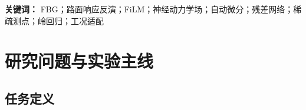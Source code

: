 \documentclass[11pt,a4paper]{article}
\newcommand{\ue}{\,\mu\varepsilon}
\begin{document}
\begin{abstract}
本报告系统整理了 FBG 路面响应反演模型从原始 Step19 FiLM 条件调制神经动力学场，到残差网络、空间边界专家、稀疏岭仿射校准以及稳健门控方案的完整实验演进。原始模型把空间位置与加载工况分别编码，以加载编码产生逐层 FiLM 缩放和平移参数，网络先学习连续位移代理场，再通过自动微分获得与 FBG 对齐的纵、横向应变。该模型在训练集和验证集上分别达到 $R^2=0.9535$ 和 $0.9659$，但独立测试集仅为 $0.7810$；其中 40\,kg 纵中心线 95\,cm 极边界工况为最明显短板，$R^2=0.3703$、RMSE $=202.898\ue$。

为解决该问题，首先进行了 Residual-FiLM 与空间边界专家（MoE 风格）的快速筛选。小规模快速实验曾显示轻微收益，但在恢复 Step19 的网络宽度、FiLM 层数、边界特征、镜像增强、5 折工况级划分和 2400 次迭代后，原始 SOTA 在完整零样本测试上达到 $R^2=0.8467$、RMSE $=79.51\ue$，显著优于 Residual-FiLM 的 $R^2=0.7106$、RMSE $=109.26\ue$。因此，残差与专家结构均未被选作最终主干。

随后将问题从“重建整套网络”转化为“利用少量新工况测点校正系统性幅值与零偏”。在冻结 SOTA 主干后，采用带收缩先验的仿射校准
$\hat y_{\mathrm{cal}}=a\hat y+b$。20 次独立嵌套空间划分的最终实验表明：Ridge-6 的总体 $R^2$ 由 $0.8412$ 提升到 $0.8623$，RMSE 由 $86.63\ue$ 降至 $80.44\ue$，平均下降 $7.15\%$；在 95\,cm 工况上平均降低 $15.78\ue$，20 次中有 85\% 获益。6 点门控方案牺牲部分平均收益，但将总体 RMSE 标准差由 Ridge-6 的 $6.93\ue$ 降至 $2.80\ue$，适合风险更敏感的部署。

\textbf{最终结论：}保留原始 Step19-SOTA FiLM+自动微分神经场作为全局共享主干；若新工况可获得 6 个稀疏测点，则使用 Ridge-6 获得最高平均精度，或使用 Gated Ridge-6 获得更稳健的风险控制。Ridge-4、Residual-FiLM、空间专家和 4 点门控保留为消融实验与方法论证据。
\end{abstract}

\vspace{0.5em}
\noindent\textbf{关键词：} FBG；路面响应反演；FiLM；神经动力学场；自动微分；残差网络；稀疏测点；岭回归；工况适配

\clearpage
\tableofcontents
\clearpage
\listoffigures
\listoftables
\clearpage
{}

\section{研究问题与实验主线}

\subsection{任务定义}
\end{document}
